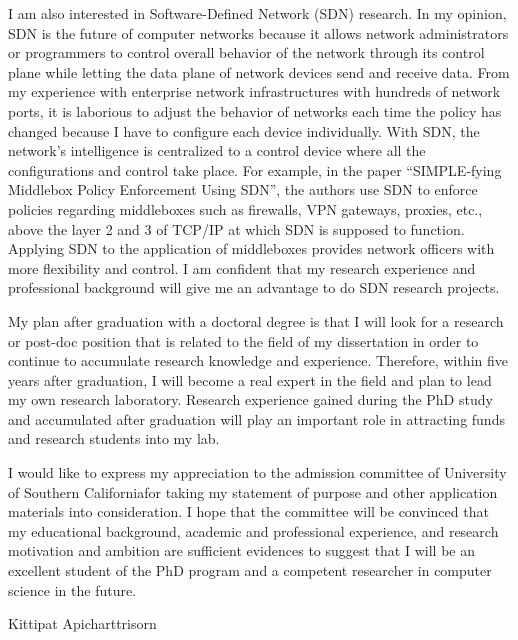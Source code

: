 \documentclass[a4paper,10pt]{report}
\newcommand{\university}{University of Southern California}
\begin{document}
\vspace{0.2cm}
I am also interested in Software-Defined Network (SDN) research. In my opinion, SDN is the future of computer networks because it allows network administrators or programmers to control overall behavior of the network through its control plane while letting the data plane of network devices send and receive data. From my experience with enterprise network infrastructures with hundreds of network ports, it is laborious to adjust the behavior of networks each time the policy has changed because I have to configure each device individually. With SDN, the network's intelligence is centralized to a control device where all the configurations and control take place. For example, in the paper ``SIMPLE-fying Middlebox Policy Enforcement Using SDN'', the authors use SDN to enforce policies regarding middleboxes such as firewalls, VPN gateways, proxies, etc., above the layer 2 and 3 of TCP/IP at which SDN is supposed to function. Applying SDN to the application of middleboxes provides network officers with more flexibility and control. I am confident that my research experience and professional background will give me an advantage to do SDN research projects.

\vspace{0.2cm}
My plan after graduation with a doctoral degree is that I will look for a research or post-doc position that is related to the field of my dissertation in order to continue to accumulate research knowledge and experience. Therefore, within five years after graduation, I will become a real expert in the field and plan to lead my own research laboratory. Research experience gained during the PhD study and accumulated after graduation will play an important role in attracting funds and research students into my lab.

\vspace{0.2cm}
I would like to express my appreciation to the admission committee of \university \space for taking my statement of purpose and other application materials into consideration. I hope that the committee will be convinced that my educational background, academic and professional experience, and research motivation and ambition are sufficient evidences to suggest that I will be an excellent student of the PhD program and a competent researcher in computer science in the future.

\vspace{1cm}
\raggedleft Kittipat Apicharttrisorn
\end{document}
